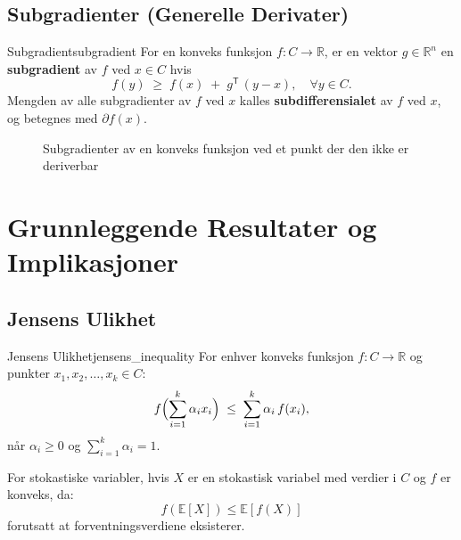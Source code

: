 \subsection{Subgradienter (Generelle Derivater)}
\begin{definition}{Subgradient}{subgradient}
  For en konveks funksjon $f: C \to \mathbb{R}$, er en vektor $g \in \mathbb{R}^n$ en \textbf{subgradient} av $f$ ved $x \in C$ hvis
  \[
  f(y)\;\ge\; f(x)\;+\; g^\mathsf{T}\,(y-x),\quad \forall y \in C.
  \]
  Mengden av alle subgradienter av $f$ ved $x$ kalles \textbf{subdifferensialet} av $f$ ved $x$, og betegnes med $\partial f(x)$.
\end{definition}

\begin{figure}[htb]
  \centering
  \caption{Subgradienter av en konveks funksjon ved et punkt der den ikke er deriverbar}
  \label{fig:subgradients}
\end{figure}

\section{Grunnleggende Resultater og Implikasjoner}

\subsection{Jensens Ulikhet}
\begin{theorem}{Jensens Ulikhet}{jensens_inequality}
  For enhver konveks funksjon $f: C \to \mathbb{R}$ og punkter $x_1, x_2, \ldots, x_k \in C$:
  \[
  f\Bigl(\sum_{i=1}^k \alpha_i x_i \Bigr) \;\le\; \sum_{i=1}^k \alpha_i\, f(x_i),
  \]
  når $\alpha_i\ge 0$ og $\sum_{i=1}^k \alpha_i=1$.
  
  For stokastiske variabler, hvis $X$ er en stokastisk variabel med verdier i $C$ og $f$ er konveks, da:
  \[
  f(\mathbb{E}[X]) \leq \mathbb{E}[f(X)]
  \]
  forutsatt at forventningsverdiene eksisterer.
\end{theorem}

